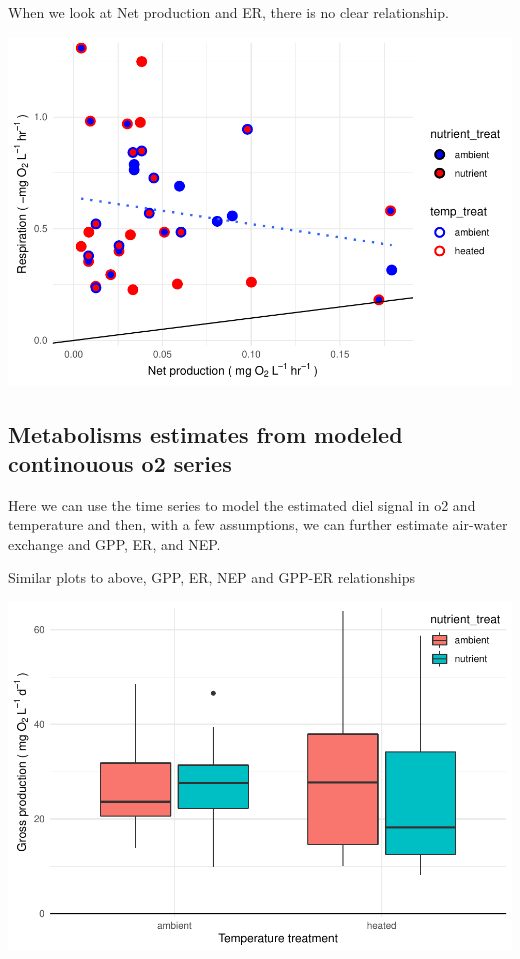 \documentclass[
]{article}
\begin{document}
When we look at Net production and ER, there is no clear relationship.

\includegraphics{GPP-report_files/figure-latex/NPP-ER scatter-1.pdf}

\hypertarget{metabolisms-estimates-from-modeled-continouous-o2-series}{%
\subsection{Metabolisms estimates from modeled continouous o2
series}\label{metabolisms-estimates-from-modeled-continouous-o2-series}}

Here we can use the time series to model the estimated diel signal in o2
and temperature and then, with a few assumptions, we can further
estimate air-water exchange and GPP, ER, and NEP.

Similar plots to above, GPP, ER, NEP and GPP-ER relationships

\includegraphics{GPP-report_files/figure-latex/cont gpp boxplots-1.pdf}
\end{document}
